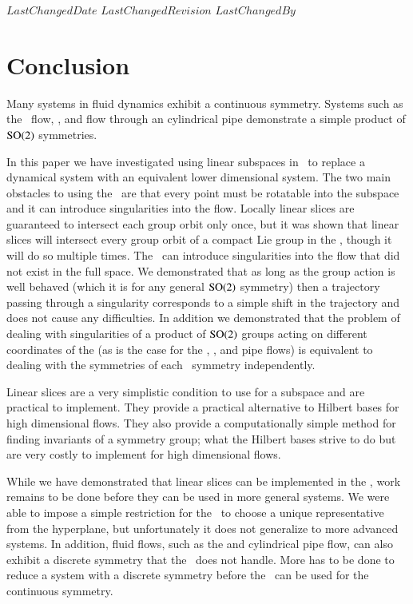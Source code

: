 
{$LastChangedDate$}
{$LastChangedRevision$} {$LastChangedBy$}


\section{Conclusion}

Many systems in fluid dynamics exhibit a continuous symmetry. Systems
such as the \KS\ flow,
{\pCf}, and flow through an
cylindrical pipe demonstrate a simple product of
$\textrm{SO}(2)$ symmetries.

In this paper we have investigated using linear subspaces in
\mslices\ to replace a dynamical system with an equivalent
lower dimensional system. The two main obstacles to using the \mslices\
are that every point must be rotatable into the subspace and it can
introduce singularities into the flow. Locally linear slices are
guaranteed to intersect each group orbit only once, but it was shown that
linear slices will intersect every group orbit of a compact Lie group in
the {\statesp}, though it will do so multiple times. The \mslices\ can
introduce singularities into the flow that did not exist in the full
space. We demonstrated that as long as the group action is well behaved
(which it is for any general $\textrm{SO}(2)$ symmetry) then a trajectory
passing through a singularity corresponds to a simple shift in the
trajectory and does not cause any difficulties. In addition we
demonstrated that the problem of dealing with singularities of a product
of $\textrm{SO}(2)$ groups acting on different coordinates of the {\statesp}
(as is the case for the \KS\rf{ku,siv},
{\pCf}, and
pipe flows) is equivalent to dealing with the
symmetries of each \SOn{2}\ symmetry independently.

Linear slices are a very simplistic condition to use for a subspace and
are practical to implement. They provide a practical alternative to
Hilbert bases for high dimensional flows. They also provide a
computationally simple method for finding invariants of a symmetry group;
what the Hilbert bases strive to do but are very costly to implement for
high dimensional flows.

While we have demonstrated that linear slices can be implemented in the
\mslices, work remains to be done before they can be used in more general
systems. We were able to impose a simple restriction for the
\cLe\ to choose a unique representative from the
hyperplane, but unfortunately it does not generalize to more advanced
systems. In addition, fluid flows, such as the {\pCf} and cylindrical
pipe flow, can also exhibit a discrete symmetry that the \mslices\ does
not handle. More has to be done to reduce a system with a discrete
symmetry before the \mslices\ can be used for the continuous symmetry.
